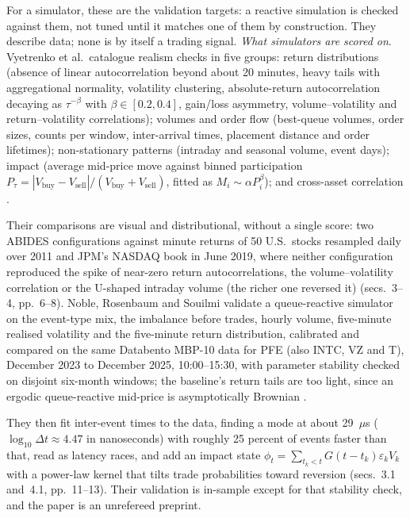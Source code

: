 \begin{qfevidence}
 For a simulator, these are the validation targets: a reactive simulation is checked against them, not tuned until it matches one of them by construction. They describe data; none is by itself a trading signal. \emph{What simulators are scored on}. Vyetrenko et al.\ catalogue realism checks in five groups: return distributions (absence of linear autocorrelation beyond about 20 minutes, heavy tails with aggregational normality, volatility clustering, absolute-return autocorrelation decaying as $\tau^{-\beta}$ with $\beta\in[0.2,0.4]$, gain/loss asymmetry, volume--volatility and return--volatility correlations); volumes and order flow (best-queue volumes, order sizes, counts per window, inter-arrival times, placement distance and order lifetimes); non-stationary patterns (intraday and seasonal volume, event days); impact (average mid-price move against binned participation $P_\tau=|V_{\text{buy}}-V_{\text{sell}}|/(V_{\text{buy}}+V_{\text{sell}})$, fitted as $M_i\sim\alpha P_i^{\beta}$); and cross-asset correlation \citep[arXiv v1, sec.~2, pp.~4--6]{w2-vyetrenko-realism}.

Their comparisons are visual and distributional, without a single score: two ABIDES configurations against minute returns of 50 U.S.\ stocks resampled daily over 2011 and JPM's NASDAQ book in June 2019, where neither configuration reproduced the spike of near-zero return autocorrelations, the volume--volatility correlation or the U-shaped intraday volume (the richer one reversed it) (secs.~3--4, pp.~6--8). Noble, Rosenbaum and Souilmi validate a queue-reactive simulator on the event-type mix, the imbalance before trades, hourly volume, five-minute realised volatility and the five-minute return distribution, calibrated and compared on the same Databento MBP-10 data for PFE (also INTC, VZ and T), December 2023 to December 2025, 10:00--15:30, with parameter stability checked on disjoint six-month windows; the baseline's return tails are too light, since an ergodic queue-reactive mid-price is asymptotically Brownian \citep[arXiv v1 of 25 March 2026, secs.~2.7--2.8, pp.~8--9]{exp-noble-rosenbaum-souilmi-reality-gap}.

They then fit inter-event times to the data, finding a mode at about 29~$\mu$s ($\log_{10}\Delta t\approx4.47$ in nanoseconds) with roughly 25 percent of events faster than that, read as latency races, and add an impact state $\phi_t=\sum_{t_k<t}G(t-t_k)\varepsilon_kV_k$ with a power-law kernel that tilts trade probabilities toward reversion (secs.~3.1 and~4.1, pp.~11--13). Their validation is in-sample except for that stability check, and the paper is an unrefereed preprint.


\end{qfevidence}
